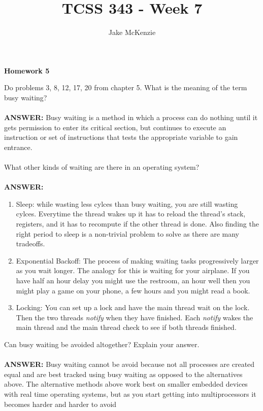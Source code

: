 \documentclass[12pt]{article}
\begin{document}
\title{TCSS 343 - Week 7}
\author{Jake McKenzie}
\maketitle
\noindent\centerline{\textbf{Homework 5}}
\noindent Do problems 3, 8, 12, 17, 20 from chapter 5.
 What is the meaning of the term busy waiting? \\\\
\textbf{ANSWER: }Busy waiting is a method in which a process can do nothing 
until it gets permission to enter its critical section, but continues to execute 
an instruction or set of instructions that tests the appropriate variable to 
gain entrance. \\\\
What other kinds of waiting are there in an operating system? \\\\
\textbf{ANSWER: }
\begin{enumerate}
    \item Sleep: while wasting less cylces than busy waiting, you are
    still wasting cylces. Everytime the thread wakes up it has to 
    reload the thread's stack, registers, and it has to recompute
    if the other thread is done. Also finding the right period to sleep 
    is a non-trivial problem to solve as there are many tradeoffs.
    \item Exponential Backoff: The process of making waiting tasks 
    progressively larger as you wait longer. The analogy for this 
    is waiting for your airplane. If you have half an hour delay 
    you might use the restroom, an hour well then you might play 
    a game on your phone, a few hours and you might read a book.
    \item Locking: You can set up a lock and have the main 
    thread wait on the lock. Then the two threads \textit{notify} 
    when they have finished. Each \textit{notify} wakes the main 
    thread and the main thread check to see if both threads finished.
\end{enumerate}
Can busy waiting be avoided altogether? Explain your answer.\\\\
\textbf{ANSWER: }Busy waiting cannot be avoid because not all processes 
are created equal and are best tracked using busy waiting as opposed to 
the alternatives above. The alternative methods above work best 
on smaller embedded devices with real time operating systems, but as 
you start getting into multiprocessors it becomes harder and harder to avoid 
\end{document}
